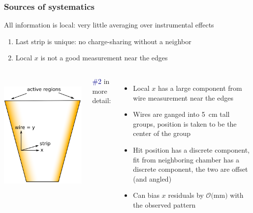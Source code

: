 \documentclass[compress]{beamer}
\begin{document}
\begin{frame}
\frametitle{Sources of systematics}
\small
All information is local: very little averaging over instrumental effects
\begin{enumerate}
\item Last strip is unique: no charge-sharing without a neighbor
\item Local $x$ is not a good measurement near the edges
\end{enumerate}

\vfill
\begin{columns}

\mbox{ } \hfill \includegraphics[width=\linewidth]{directions.png} \hfill \mbox{ }


\textcolor{darkblue}{\#2} in more detail:
\begin{itemize}
\item Local $x$ has a large component from wire measurement near the edges
\item Wires are ganged into 5~cm tall groups, position is taken to be the center of the group
\item Hit position has a discrete component, fit from neighboring chamber has a discrete component, the two are offset (and angled)
\item Can bias $x$ residuals by $\mathcal{O}($mm$)$ with the observed pattern
\end{itemize}
\end{columns}


\end{frame}
\end{document}
